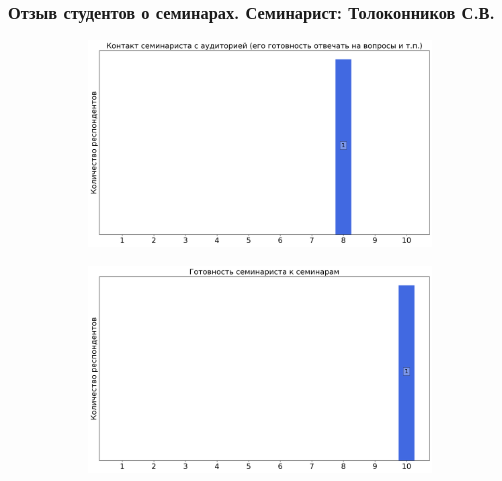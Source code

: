     \subsubsection{Отзыв студентов о семинарах. Семинарист: Толоконников С.В.}
        \begin{figure}[H]
            \centering
            \begin{subfigure}[b]{0.45\textwidth}
                \centering
                \includegraphics[width=\textwidth]{images/3 course/Теория поля/seminarists-marks-Толоконников С.В.-0.png}
            \end{subfigure}
            \begin{subfigure}[b]{0.45\textwidth}
                \centering
                \includegraphics[width=\textwidth]{images/3 course/Теория поля/seminarists-marks-Толоконников С.В.-1.png}
            \end{subfigure}
            \begin{subfigure}[b]{0.45\textwidth}
                \centering

\end{subfigure}
\end{figure}
